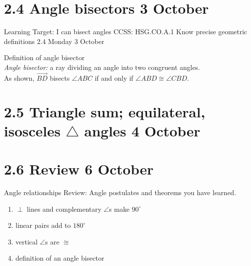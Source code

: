\section{2.4 Angle bisectors \hfill 3 October}
\begin{frame}{Learning Target: I can bisect angles}
  {CCSS: HSG.CO.A.1 Know precise geometric definitions  \hfill \alert{2.4 Monday 3 October}}

  Definition of angle bisector\\
  \emph{Angle bisector:} a ray dividing an angle into two congruent angles.\\[0.5cm]
  As shown, $\overrightarrow{BD}$ bisects $\angle ABC$ if and only if $\angle ABD \cong \angle CBD$. 
  \begin{center}
    \end{center}
  \end{frame}


\section{2.5 Triangle sum; equilateral, isosceles $\triangle$ angles \hfill 4 October}

\section{2.6 Review \hfill 6 October}
\begin{frame}{Angle relationships}
  Review: Angle postulates and theorems you have learned. 
  \begin{enumerate}
    \item $\perp$ lines and complementary $\angle$s make $90^\circ$
    \item linear pairs add to $180^\circ$
    \item vertical $\angle$s are $\cong$
    \item definition of an angle bisector
  \end{enumerate}
\end{frame}

